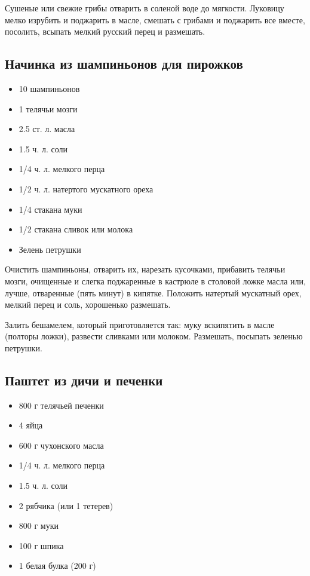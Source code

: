 Сушеные или свежие грибы отварить в соленой воде до мягкости. Луковицу мелко изрубить и поджарить в масле, смешать с грибами и поджарить все вместе, посолить, всыпать мелкий русский перец и размешать.

\subsection{Начинка из шампиньонов для пирожков}

\begin{itemize}
	\item 10 шампиньонов
    \item 1 телячьи мозги
    \item 2.5 ст. л. масла 
    \item 1.5 ч. л. соли 
    \item 1/4 ч. л. мелкого перца
    \item 1/2 ч. л. натертого мускатного ореха 
    \item 1/4 стакана муки 
    \item 1/2 стакана сливок или молока
    \item Зелень петрушки
\end{itemize}

Очистить шампиньоны, отварить их, нарезать кусочками, прибавить телячьи мозги, очищенные и слегка поджаренные в кастрюле в столовой ложке масла или, лучше, отваренные (пять минут) в кипятке. Положить натертый мускатный орех, мелкий перец и соль, хорошенько размешать.

Залить бешамелем, который приготовляется так: муку вскипятить в масле (полторы ложки), развести сливками или молоком. Размешать, посыпать зеленью петрушки.

\subsection{Паштет из дичи и печенки}

\begin{itemize}
	\item 800 г телячьей печенки 
    \item 4 яйца 
    \item 600 г чухонского масла
    \item 1/4 ч. л. мелкого перца 
    \item 1.5 ч. л. соли 
    \item 2 рябчика (или 1 тетерев) 
    \item 800 г муки
    \item 100 г шпика
    \item 1 белая булка (200 г)
\end{itemize}


